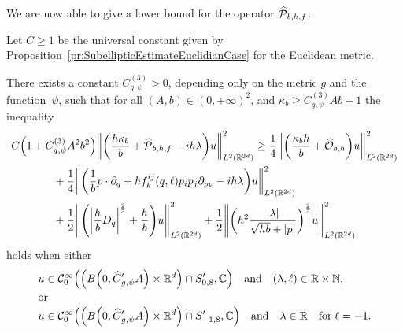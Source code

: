 \documentclass[AHL,Unicode,longabstracts]{cedram}
\newcommand{\C}{\mathbb{C}}
\newcommand{\R}{\mathbb{R}}
\newcommand{\N}{\mathbb{N}}
\newcommand{\clC}{\mathcal{C}}
\newcommand{\clO}{\mathcal{O}}
\newcommand{\clP}{\mathcal{P}}
\let\oldhat\hat
\renewcommand*{\hat}[1]{\mathchoice{\widehat{#1}}{\widehat{#1}}{\oldhat{#1}}{\oldhat{#1}}}
\let\originalleft\left
\let\originalright\right
\renewcommand{\left}{\mathopen{}\mathclose\bgroup\originalleft}
\renewcommand{\right}{\aftergroup\egroup\originalright}
\begin{document}
We are now able to give a lower bound for the operator $\hat{\clP}_{b,h,f}$.
\begin{prop}
Let $C\geq 1$ be the universal constant given by Proposition~\ref{pr:SubellipticEstimateEuclidianCase} for the Euclidean metric.

There exists a constant $C_{g,\psi}^{(3)}>0$, depending only on the metric $g$ and the function~$\psi$, such that for all $(A,b)\in (0,+\infty)^2$, and $\kappa_b \geq C_{g,\psi}^{(3)}Ab+1$ the inequality
\begin{multline}\label{eq:LowerBoundAfterChangeOfVariablesAndAfterGridPartition}
C\left(1 + C_{g,\psi}^{(3)}A^2b^2\right)\left\| \left(\frac{h\kappa_b}{b} + \hat{\clP}_{b,h,f} -i h\lambda \right) u \right\|_{L^2(\R^{2d})}^{2}
\geq \frac{1}{4} \left\|\left(\frac{\kappa_b h}{b}+\hat{\clO}_{b,h}\right) u\right\|_{L^2(\R^{2d})}^2
\\
\begin{aligned}
&+ \frac{1}{4}\left\| \left(\frac{1}{b} p\cdot\partial_q+hf^{ij}_{k}(q,\ell)p_ip_j\partial_{p_k}-i h \lambda \right)u \right\|_{L^2(\R^{2d})}^2
\\
&+\frac{1}{2} \left\| \left(\left|\frac{h}{b}D_{q} \right|^{\frac{2}{3}}+ \frac{h}{b}\right) u \right\|_{L^2(\R^{2d})}^{2} +
\frac{1}{2}\left\| \left(h^2 \frac{|\lambda|}{\sqrt{hb}+|p|} \right)^{\frac{2}{3}} u \right\|_{L^2(\R^{2d})}^{2}
\end{aligned}
\end{multline}
holds when either
\begin{align*}
u &\in \clC^\infty_0\left(\left(B\left(0,\hat{C}'_{g,\psi}A\right)\times \R^d\right)\cap S_{0,8}',\C\right)\quad\text{and}\quad (\lambda,\ell)\in \R\times \N,\\
\intertext{or}
u &\in \clC^\infty_0\left(\left(B\left(0,\hat{C}'_{g,\psi}A\right)\times \R^d\right)\cap S_{-1,8}',\C\right)\quad \text{and}\quad \lambda\in \R\quad\text{for}\; \ell=-1.
\end{align*}
\end{prop}
\end{document}
